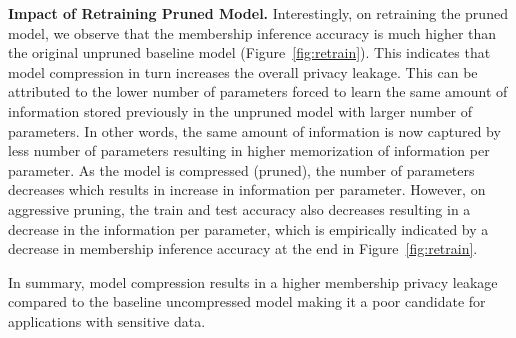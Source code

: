 \textbf{Impact of Retraining Pruned Model.} Interestingly, on retraining the pruned model, we observe that the membership inference accuracy is much higher than the original unpruned baseline model (Figure~\ref{fig:retrain}).
This indicates that model compression in turn increases the overall privacy leakage.
This can be attributed to the lower number of parameters forced to learn the same amount of information stored previously in the unpruned model with larger number of parameters.
In other words, the same amount of information is now captured by less number of parameters resulting in higher memorization of information per parameter.
As the model is compressed (pruned), the number of parameters decreases which results in increase in information per parameter. However, on aggressive pruning, the train and test accuracy also decreases resulting in a decrease in the information per parameter, which is empirically indicated by a decrease in membership inference accuracy at the end in Figure~\ref{fig:retrain}.


In summary, model compression results in a higher membership privacy leakage compared to the baseline uncompressed model making it a poor candidate for applications with sensitive data.

